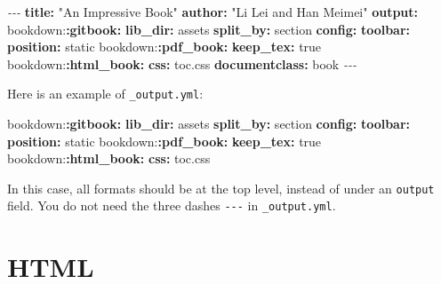 \documentclass[
  12pt,
]{krantz}
\newenvironment{Shaded}{\begin{snugshade}}{\end{snugshade}}
\newcommand{\AttributeTok}[1]{\textcolor[rgb]{0.13,0.29,0.53}{#1}}
\newcommand{\CharTok}[1]{\textcolor[rgb]{0.31,0.60,0.02}{#1}}
\newcommand{\FunctionTok}[1]{\textcolor[rgb]{0.13,0.29,0.53}{\textbf{#1}}}
\newcommand{\KeywordTok}[1]{\textcolor[rgb]{0.13,0.29,0.53}{\textbf{#1}}}
\newcommand{\PreprocessorTok}[1]{\textcolor[rgb]{0.56,0.35,0.01}{\textit{#1}}}
\newcommand{\StringTok}[1]{\textcolor[rgb]{0.31,0.60,0.02}{#1}}
\theoremstyle{definition}
\theoremstyle{definition}
\theoremstyle{definition}
\theoremstyle{definition}
\theoremstyle{remark}
\begin{document}
\begin{Shaded}
\begin{Highlighting}[]
\PreprocessorTok{{-}{-}{-}}
\FunctionTok{title}\KeywordTok{:}\AttributeTok{ }\StringTok{"An Impressive Book"}
\FunctionTok{author}\KeywordTok{:}\AttributeTok{ }\StringTok{"Li Lei and Han Meimei"}
\FunctionTok{output}\KeywordTok{:}
\AttributeTok{  bookdown:}\FunctionTok{:gitbook}\KeywordTok{:}
\AttributeTok{    }\FunctionTok{lib\_dir}\KeywordTok{:}\AttributeTok{ assets}
\AttributeTok{    }\FunctionTok{split\_by}\KeywordTok{:}\AttributeTok{ section}
\AttributeTok{    }\FunctionTok{config}\KeywordTok{:}
\AttributeTok{      }\FunctionTok{toolbar}\KeywordTok{:}
\AttributeTok{        }\FunctionTok{position}\KeywordTok{:}\AttributeTok{ static}
\AttributeTok{  bookdown:}\FunctionTok{:pdf\_book}\KeywordTok{:}
\AttributeTok{    }\FunctionTok{keep\_tex}\KeywordTok{:}\AttributeTok{ }\CharTok{true}
\AttributeTok{  bookdown:}\FunctionTok{:html\_book}\KeywordTok{:}
\AttributeTok{    }\FunctionTok{css}\KeywordTok{:}\AttributeTok{ toc.css}
\FunctionTok{documentclass}\KeywordTok{:}\AttributeTok{ book}
\PreprocessorTok{{-}{-}{-}}
\end{Highlighting}
\end{Shaded}

Here is an example of \texttt{\_output.yml}:

\begin{Shaded}
\begin{Highlighting}[]
\AttributeTok{bookdown:}\FunctionTok{:gitbook}\KeywordTok{:}
\AttributeTok{  }\FunctionTok{lib\_dir}\KeywordTok{:}\AttributeTok{ assets}
\AttributeTok{  }\FunctionTok{split\_by}\KeywordTok{:}\AttributeTok{ section}
\AttributeTok{  }\FunctionTok{config}\KeywordTok{:}
\AttributeTok{    }\FunctionTok{toolbar}\KeywordTok{:}
\AttributeTok{      }\FunctionTok{position}\KeywordTok{:}\AttributeTok{ static}
\AttributeTok{bookdown:}\FunctionTok{:pdf\_book}\KeywordTok{:}
\AttributeTok{  }\FunctionTok{keep\_tex}\KeywordTok{:}\AttributeTok{ }\CharTok{true}
\AttributeTok{bookdown:}\FunctionTok{:html\_book}\KeywordTok{:}
\AttributeTok{  }\FunctionTok{css}\KeywordTok{:}\AttributeTok{ toc.css}
\end{Highlighting}
\end{Shaded}

In this case, all formats should be at the top level, instead of under an \texttt{output} field. You do not need the three dashes \texttt{-\/-\/-} in \texttt{\_output.yml}.

\section{HTML}\label{html}
\end{document}
